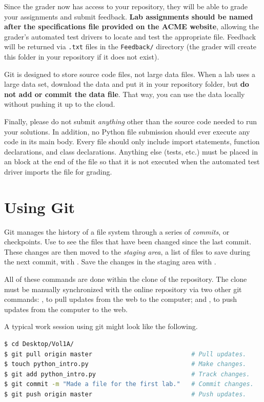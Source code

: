 Since the grader now has access to your repository, they will be able to grade your assignments and submit feedback.
\textbf{Lab assignments should be named after the specifications file provided on the ACME website}, allowing the grader's automated test drivers to locate and test the appropriate file.
Feedback will be returned via \texttt{.txt} files in the \texttt{Feedback/} directory (the grader will create this folder in your repository if it does not exist).

Git is designed to store source code files, not large data files.
When a lab uses a large data set, download the data and put it in your repository folder, but \textbf{do not add or commit the data file}.
That way, you can use the data locally without pushing it up to the cloud.

Finally, please do not submit \emph{anything} other than the source code needed to run your solutions.
In addition, no Python file submission should ever execute any code in its main body.
Every file should only include import statements, function declarations, and class declarations.
Anything else (tests, etc.) must be placed in an  block at the end of the file so that it is not executed when the automated test driver imports the file for grading.

\section*{Using Git} %

Git manages the history of a file system through a series of \emph{commits}, or checkpoints.
Use  to see the files that have been changed since the last commit.
These changes are then moved to the \emph{staging area}, a list of files to save during the next commit, with .
Save the changes in the staging area with .

All of these commands are done within the clone of the repository.
The clone must be manually synchronized with the online repository via two other git commands: , to pull updates from the web to the computer; and , to push updates from the computer to the web.

A typical work session using git might look like the following.

\begin{lstlisting}[language=bash]
$ cd Desktop/Vol1A/
$ git pull origin master                           # Pull updates.
$ touch python_intro.py                            # Make changes.
$ git add python_intro.py                          # Track changes.
$ git commit -m "Made a file for the first lab."   # Commit changes.
$ git push origin master                           # Push updates.
\end{lstlisting}

